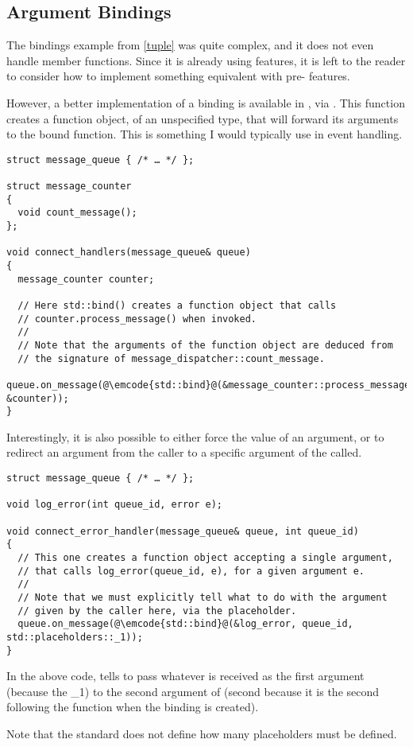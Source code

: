 \subsection{Argument Bindings}

The bindings example from \ref{tuple} was quite complex, and it does
not even handle member functions. Since it is already using 
features, it is left to the reader to consider how to implement
something equivalent with pre- features.

However, a better implementation of a binding is available in ,
via . This function creates a function object, of an
unspecified type, that will forward its arguments to the bound
function. This is something I would typically use in event handling.

\begin{lstlisting}
struct message_queue { /* … */ };

struct message_counter
{
  void count_message();
};

void connect_handlers(message_queue& queue)
{
  message_counter counter;

  // Here std::bind() creates a function object that calls
  // counter.process_message() when invoked.
  //
  // Note that the arguments of the function object are deduced from
  // the signature of message_dispatcher::count_message.
  queue.on_message(@\emcode{std::bind}@(&message_counter::process_message, &counter));
}
\end{lstlisting}

Interestingly, it is also possible to either force the value of an
argument, or to redirect an argument from the caller to a specific
argument of the called.

\begin{lstlisting}
struct message_queue { /* … */ };

void log_error(int queue_id, error e);

void connect_error_handler(message_queue& queue, int queue_id)
{
  // This one creates a function object accepting a single argument,
  // that calls log_error(queue_id, e), for a given argument e.
  //
  // Note that we must explicitly tell what to do with the argument
  // given by the caller here, via the placeholder.
  queue.on_message(@\emcode{std::bind}@(&log_error, queue_id, std::placeholders::_1));
}
\end{lstlisting}

In the above code,  tells
 to pass whatever is received as the first argument
(because the \_1) to the second argument of  (second
because it is the second following the function when the binding is
created).

Note that the standard does not define how many placeholders must be
defined.
